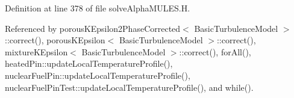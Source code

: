 Definition at line 378 of file solve\+Alpha\+M\+U\+L\+E\+S.\+H.



Referenced by porous\+K\+Epsilon2\+Phase\+Corrected$<$ Basic\+Turbulence\+Model $>$\+::correct(), porous\+K\+Epsilon$<$ Basic\+Turbulence\+Model $>$\+::correct(), mixture\+K\+Epsilon$<$ Basic\+Turbulence\+Model $>$\+::correct(), for\+All(), heated\+Pin\+::update\+Local\+Temperature\+Profile(), nuclear\+Fuel\+Pin\+::update\+Local\+Temperature\+Profile(), nuclear\+Fuel\+Pin\+Test\+::update\+Local\+Temperature\+Profile(), and while().

